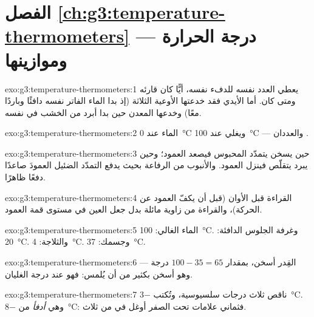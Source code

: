 \section*{الفصل \ref{ch:g3:temperature-thermometers} --- درجة الحرارة وموازينها}

\begin{solution}{exo:g3:temperature-thermometers:1}
 يعطي العدد نفسه للدفء نفسه، أيًّا كان قارئه ومتى
كان. أما الأيدي فقد خدعتها الأوعية الثلاثة (إذ بدا الماء الفاتر
نفسه دافئًا وباردًا معًا) وخدعها المعدن حين بدا أبرد من الخشب في
 نفسه.
\end{solution}

\begin{solution}{exo:g3:temperature-thermometers:2}
 الماء عند \qty{0}{\celsius} ويغلي عند \qty{100}{\celsius}
--- والعددان .
\end{solution}

\begin{solution}{exo:g3:temperature-thermometers:3}
حين يسخن يتمدّد  المحبوس فيصعد العمود؛ وحين يبرد يتقلّص
فينزل العمود. والأنبوب من الرفاعة بحيث يدفع التمدّد الضئيل
العمودَ صاعدًا دفعًا ظاهرًا.
\end{solution}

\begin{solution}{exo:g3:temperature-thermometers:4}
القراءة قبل الأوان (قبل أن يكفّ العمود عن الحركة)، والقراءة من
زاوية مائلة بدل جعل العين في مستوى قمة العمود.
\end{solution}

\begin{solution}{exo:g3:temperature-thermometers:5}
الماء الغالي: \qty{100}{\celsius}. وغرفة الجلوس الدافئة:
\qty{20}{\celsius}. والثلاجة: \qty{4}{\celsius}. وجسمك:
\qty{37}{\celsius}.
\end{solution}

\begin{solution}{exo:g3:temperature-thermometers:6}
القِدر أسخن، بمقدار $100 - 35 = 65$ درجة --- وهو أسخن بكثير من
أن يُلمس: فهو عند درجة الغليان.
\end{solution}

\begin{solution}{exo:g3:temperature-thermometers:7}
ناقص ثلاث درجات سلسيوسية، وتُكتب \qty{-3}{\celsius}. وهي
\emph{أدفأ} من \qty{-8}{\celsius}: فثماني علامات تحت الصفر أوغل
في  من ثلاث.
\end{solution}

